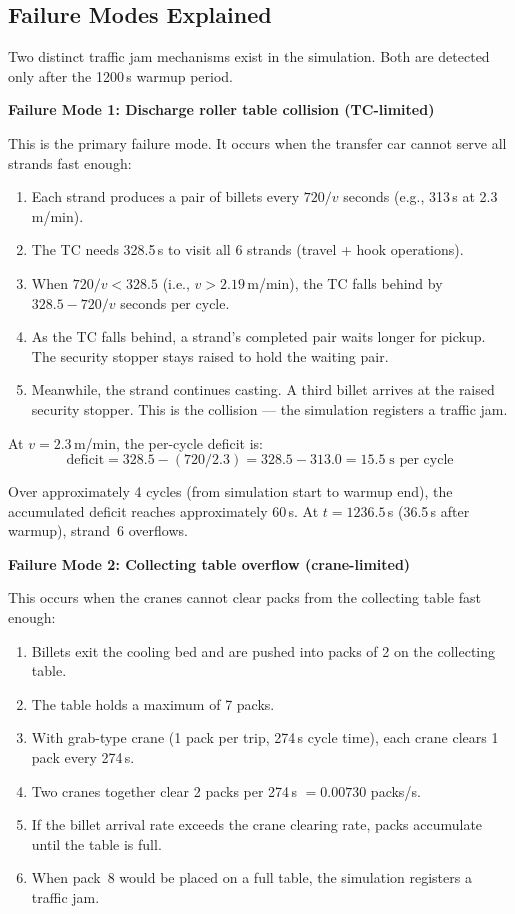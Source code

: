 \documentclass[11pt,a4paper]{article}
\begin{document}
\subsection{Failure Modes Explained}

Two distinct traffic jam mechanisms exist in the simulation. Both are detected only after the 1200\,s warmup period.

\textbf{Failure Mode 1: Discharge roller table collision (TC-limited)}

This is the primary failure mode. It occurs when the transfer car cannot serve all strands fast enough:
\begin{enumerate}
    \item Each strand produces a pair of billets every $720/v$ seconds (e.g., 313\,s at 2.3\,m/min).
    \item The TC needs 328.5\,s to visit all 6 strands (travel + hook operations).
    \item When $720/v < 328.5$ (i.e., $v > 2.19$\,m/min), the TC falls behind by $328.5 - 720/v$ seconds per cycle.
    \item As the TC falls behind, a strand's completed pair waits longer for pickup. The security stopper stays raised to hold the waiting pair.
    \item Meanwhile, the strand continues casting. A third billet arrives at the raised security stopper. This is the collision --- the simulation registers a traffic jam.
\end{enumerate}

At $v = 2.3$\,m/min, the per-cycle deficit is:
\begin{equation}
\text{deficit} = 328.5 - (720 / 2.3) = 328.5 - 313.0 = 15.5\;\text{s per cycle}
\end{equation}

Over approximately 4 cycles (from simulation start to warmup end), the accumulated deficit reaches approximately 60\,s. At $t = 1236.5$\,s (36.5\,s after warmup), strand~6 overflows.

\textbf{Failure Mode 2: Collecting table overflow (crane-limited)}

This occurs when the cranes cannot clear packs from the collecting table fast enough:
\begin{enumerate}
    \item Billets exit the cooling bed and are pushed into packs of 2 on the collecting table.
    \item The table holds a maximum of 7 packs.
    \item With grab-type crane (1 pack per trip, 274\,s cycle time), each crane clears 1 pack every 274\,s.
    \item Two cranes together clear 2 packs per 274\,s $= 0.00730$ packs/s.
    \item If the billet arrival rate exceeds the crane clearing rate, packs accumulate until the table is full.
    \item When pack~8 would be placed on a full table, the simulation registers a traffic jam.
\end{enumerate}
\end{document}
